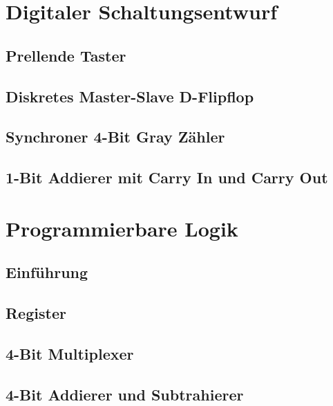 \documentclass[paper=a4, fontsize=11pt]{scrartcl}
\numberwithin{equation}{section}
\numberwithin{figure}{section}
\numberwithin{table}{section}
\begin{document}

\newpage

\section{Digitaler Schaltungsentwurf}

\subsection{Prellende Taster}

\subsection{Diskretes Master-Slave D-Flipflop}

\subsection{Synchroner 4-Bit Gray Zähler}

\subsection{1-Bit Addierer mit Carry In und Carry Out}


\newpage

\section{Programmierbare Logik}

\subsection{Einführung}

\subsection{Register}

\subsection{4-Bit Multiplexer}

\subsection{4-Bit Addierer und Subtrahierer}
\end{document}
